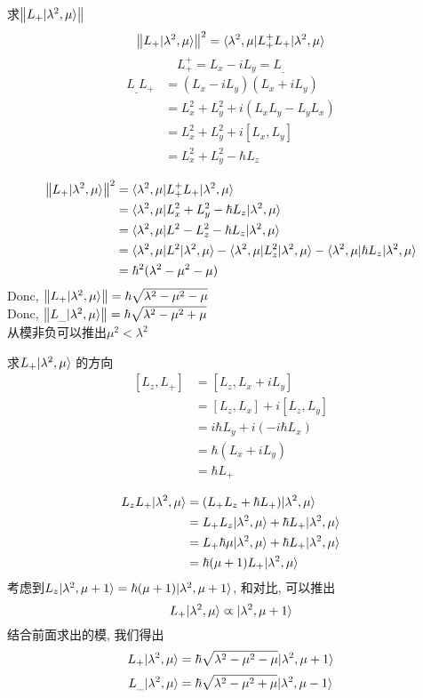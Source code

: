 \documentclass{article}
\begin{document}
求$\left\Vert L_+|\lambda^2, \mu\rangle\right\Vert$
$$
\left\Vert L_+ |\lambda^2,\mu\rangle\right\Vert^2 = \langle\lambda^2,\mu|L_+^+ L_+|\lambda^2,\mu\rangle
$$
$$
L_+^+ = L_x - i L_y = L_{\_}
$$
\begin{equation}
\begin{aligned}
L_{\_} L_+
& = (L_x - i L_y)(L_x + i L_y)\\
& = L_x^2 + L_y^2 + i(L_x L_y - L_y L_x)\\
& = L_x^2 + L_y^2 + i[L_x, L_y]\\
& = L_x^2 + L_y^2 - \hbar L_z
\end{aligned}
\end{equation}

\begin{equation}
\begin{aligned}
\left\Vert L_+ |\lambda^2,\mu\rangle\right\Vert^2
& = \langle\lambda^2,\mu|L_+^+ L_+|\lambda^2,\mu\rangle\\
& = \langle\lambda^2,\mu|L_x^2 + L_y^2 - \hbar L_z|\lambda^2,\mu\rangle\\
& = \langle\lambda^2,\mu|L^2 - L_z^2 - \hbar L_z|\lambda^2,\mu\rangle\\
& = \langle\lambda^2,\mu|L^2|\lambda^2,\mu\rangle
- \langle\lambda^2,\mu|L_z^2|\lambda^2,\mu\rangle
- \langle\lambda^2,\mu|\hbar L_z|\lambda^2,\mu\rangle\\
& = \hbar^2(\lambda^2 - \mu^2 - \mu)
\end{aligned}
\end{equation}
Donc, $\left\Vert L_+ |\lambda^2,\mu\rangle\right\Vert = \hbar \sqrt{\lambda^2 - \mu^2 - \mu}$\\
Donc, $\left\Vert L_{\_} |\lambda^2,\mu\rangle\right\Vert = \hbar \sqrt{\lambda^2 - \mu^2 + \mu}$\\
从模非负可以推出$\mu^2 < \lambda^2$

求$L_+|\lambda^2, \mu\rangle$ 的方向
$$
\begin{aligned}
[L_z, L_+]
& = [L_z, L_x + i L_y] \\
& = [L_z, L_x] + i [L_z, L_y] \\
& = i\hbar L_y + i(-i\hbar L_x) \\
& = \hbar (L_x + i L_y) \\
& = \hbar L_+
\end{aligned}
$$

\begin{equation}
\begin{aligned}
L_zL_+|\lambda^2,\mu\rangle
& = (L_+L_z + \hbar L_+)|\lambda^2, \mu\rangle \\
& = L_+L_z|\lambda^2, \mu\rangle + \hbar L_+|\lambda^2, \mu\rangle \\
& = L_+ \hbar \mu |\lambda^2, \mu\rangle + \hbar L_+|\lambda^2, \mu\rangle \\
& = \hbar (\mu + 1) L_+ |\lambda^2, \mu\rangle
\end{aligned}
\end{equation}
考虑到$L_z |\lambda^2,\mu + 1\rangle = \hbar (\mu+1)|\lambda^2,\mu+1\rangle$, 和\lasteq 对比, 可以推出
$$
L_+|\lambda^2,\mu\rangle \varpropto |\lambda^2,\mu+1\rangle
$$
结合前面求出的模, 我们得出
$$ L_+ |\lambda^2,\mu\rangle = \hbar \sqrt{\lambda^2 - \mu^2 - \mu}|\lambda^2, \mu+1\rangle $$
$$ L_{\_} |\lambda^2,\mu\rangle = \hbar \sqrt{\lambda^2 - \mu^2 + \mu}|\lambda^2, \mu-1\rangle $$
\end{document}
